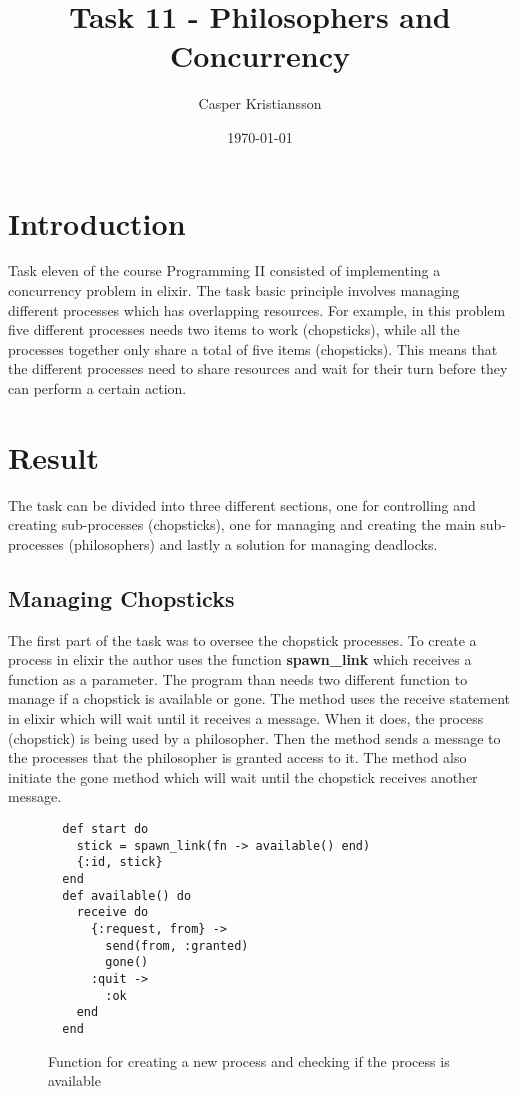 \documentclass[a4paper,11pt]{article}
\begin{document}
\title{
    \textbf{Task 11 - Philosophers and Concurrency}
}
\author{Casper Kristiansson}
\date{\today}
\maketitle

\section*{Introduction}
Task eleven of the course Programming II consisted of implementing a concurrency problem in elixir. The task basic principle involves managing different processes which has overlapping resources. For example, in this problem five different processes needs two items to work (chopsticks), while all the processes together only share a total of five items (chopsticks). This means that the different processes need to share resources and wait for their turn before they can perform a certain action.

\section*{Result}
The task can be divided into three different sections, one for controlling and creating sub-processes (chopsticks), one for managing and creating the main sub-processes (philosophers) and lastly a solution for managing deadlocks.

\subsection*{Managing Chopsticks}
The first part of the task was to oversee the chopstick processes. To create a process in elixir the author uses the function \textbf{spawn\_link} which receives a function as a parameter. The program than needs two different function to manage if a chopstick is available or gone. The method uses the receive statement in elixir which will wait until it receives a message. When it does, the process (chopstick) is being used by a philosopher. Then the method sends a message to the processes that the philosopher is granted access to it. The method also initiate the gone method which will wait until the chopstick receives another message.

\begin{figure}[H]
\begin{verbatim}
  def start do
    stick = spawn_link(fn -> available() end)
    {:id, stick}
  end
  def available() do
    receive do
      {:request, from} ->
        send(from, :granted)
        gone()
      :quit ->
        :ok
    end
  end
\end{verbatim}
\caption{Function for creating a new process and checking if the process is available}
\label{Figure:1}
\end{figure}
\end{document}
